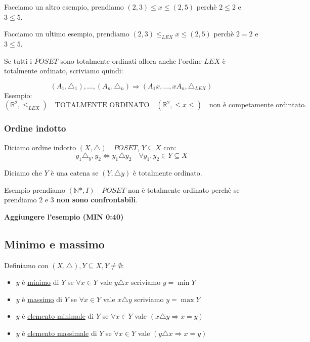 \documentclass{article}
\begin{document}
Facciamo un altro esempio, prendiamo $(2,3) \le x \le(2,5)$ perchè $2 \le 2$ e $3 \le 5$. \par
Facciamo un ultimo esempio, prendiamo $(2,3) \le_{LEX} x \le(2,5)$ perchè $2 = 2$ e $3 \le 5$. \newline

Se tutti i $POSET$ sono totalmente ordinati allora anche l'ordine $LEX$ è totalmente ordinato, scriviamo quindi:

\begin{equation*}
        (A_1,\triangle_1), \ldots, (A_n, \triangle_n) \Rightarrow (A_1x,\ldots,xA_n,\triangle_{LEX})
\end{equation*}
Esempio:
\begin{equation*}
        (\mathbb{R}^2, \le_{LEX}) \quad \mbox{TOTALMENTE ORDINATO} \quad (\mathbb{R}^2, \le x \le) \quad \mbox{non è competamente ordintato}. 
\end{equation*}


\subsubsection{Ordine indotto}
Diciamo ordine indotto $(X, \triangle) \quad POSET$, $ Y \subseteq X$ con:
\begin{equation*}
        y_1 \triangle_y,y_2 \Leftrightarrow y_1 \triangle y_2 \quad \forall y_1,y_2 \in Y \subseteq X
\end{equation*}

Diciamo che $Y$ è una catena se $(Y, \triangle y)$ è totalmente ordinato. \par

Esempio prendiamo $(\mathbb{N}*, I) \quad POSET$ non è totalmente ordinato perchè se prendiamo $2$ e $3$ \textbf{non sono confrontabili}. \par
\textbf{Aggiungere l'esempio (MIN 0:40)}


\subsection{Minimo e massimo}
Definiamo con $(X, \triangle), Y \subseteq X, Y \not = \emptyset$:
\begin{itemize}
        \item $y$ è \underline{minimo} di $Y$ se $\forall x \in Y$  vale $y \triangle x$ scriviamo $y = \min Y$
        \item $y$ è \underline{massimo} di $Y$ se $\forall x \in Y$  vale $x \triangle y$ scriviamo $y = \max Y$
        \item $y$ è \underline{elemento minimale} di $Y$ se $\forall x \in Y$  vale $(x \triangle y \Rightarrow x = y)$
        \item $y$ è \underline{elemento massimale} di $Y$ se $\forall x \in Y$  vale $(y \triangle x \Rightarrow x = y)$
\end{itemize}
\end{document}
